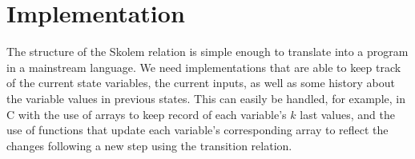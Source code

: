 \section{Implementation}
\label{sec:impl}


The structure of the Skolem relation is simple enough to translate
into a program in a mainstream language.
We need implementations that are able to keep track of the
current state variables, the current inputs, as well as some history
about the variable values in previous states. This can easily be handled, for
example, in C with the use of arrays to keep record of each variable's $k$ last
values, and the use of functions that update each variable's corresponding array
to reflect the changes following a new step using the transition relation.
